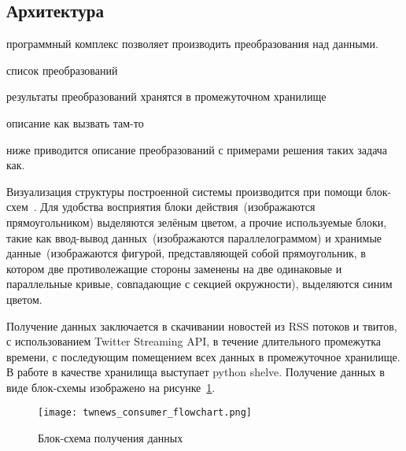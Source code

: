 \subsection{Архитектура}

    программный комплекс позволяет производить преобразования над данными. 

    список преобразований

    результаты преобразований хранятся в промежуточном хранилище

    описание как вызвать там-то

    ниже приводится описание преобразований с примерами решения таких задача как.



    \clearpage
    
    Визуализация структуры построенной системы производится при помощи блок-схем~\cite{flowchart_gost}. 
    Для удобства восприятия блоки действия~(изображаются прямоугольником) выделяются зелёным цветом, 
    а прочие используемые блоки, такие как ввод-вывод данных~(изображаются параллелограммом) и хранимые 
    данные~(изображаются фигурой, представляющей собой прямоугольник, в котором две противолежащие стороны 
    заменены на две одинаковые и параллельные кривые, совпадающие с секцией окружности), выделяются синим цветом.
    
    Получение данных заключается в скачивании новостей из RSS потоков и твитов, с использованием Twitter Streaming API, в течение длительного промежутка времени, с последующим помещением всех данных в промежуточное хранилище. В работе в качестве хранилища выступает python shelve.
    Получение данных в виде блок-схемы изображено на рисунке~\ref{pic:consumer_flowchart}.
    \begin{figure}[h!]
            \center
            \texttt{[image: twnews\_consumer\_flowchart.png]}
            \caption{Блок-схема получения данных}
            \label{pic:consumer_flowchart}
    \end{figure}

